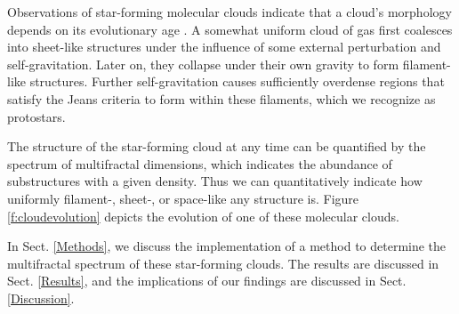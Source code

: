 \documentclass[iop]{emulateapj}
\begin{document}
Observations of star-forming molecular clouds indicate that a cloud's morphology depends on its evolutionary age \citep[see][for example]{Shu1987}. A somewhat uniform cloud of gas first coalesces into sheet-like structures under the influence of some external perturbation and self-gravitation. Later on, they collapse under their own gravity to form filament-like structures. Further self-gravitation causes sufficiently overdense regions that satisfy the Jeans criteria to form within these filaments, which we recognize as protostars.

The structure of the star-forming cloud at any time can be quantified by the spectrum of multifractal dimensions, which indicates the abundance of substructures with a given density. Thus we can quantitatively indicate how uniformly filament-, sheet-, or space-like any structure is. Figure \ref{f:cloudevolution} depicts the evolution of one of these molecular clouds.

In Sect. \ref{Methods}, we discuss the implementation of a method to determine the multifractal spectrum of these star-forming clouds. The results are discussed in Sect. \ref{Results}, and the implications of our findings are discussed in Sect. \ref{Discussion}.
\end{document}
